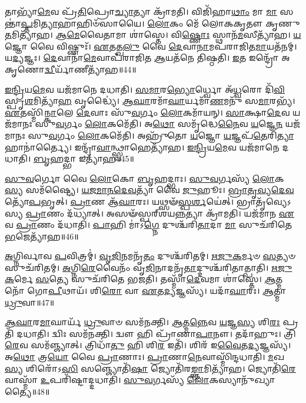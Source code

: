 𑌤𑌾𑌭𑍍𑌯𑌾᳴\-\ul{𑌮𑍇}\-𑌵 𑌪𑍍𑌰᳴\-\ul{𑌤𑌿}\-𑌪𑍍𑌰𑍋\-\ul{𑌚𑍍𑌯𑌾}\-𑌤𑍍𑌯𑌾 𑌕𑍍𑌰𑌾᳴𑌮𑌤𑌿।
𑌵𑌿𑌜𑌿᳴𑌹𑌾\-\ul{𑌥𑌾𑌂} 𑌮𑌾 \ul{𑌮𑌾} 𑌸𑌨𑍍𑌤𑌾॑\-\ul{𑌪𑍍𑌤}\-𑌮𑌿\-\ul{𑌤𑍍𑌯𑌾}\-𑌹𑌾𑌹𑌿𑍞᳴𑌸𑌾𑌯𑍈।
\-\ul{𑌲𑍋}\-𑌕𑌂 𑌮𑍇᳴ 𑌲𑍋𑌕𑌕𑍃𑌤𑍗 𑌕𑍃𑌣𑍁\-\ul{𑌤}\-𑌮𑌿𑌤𑍍𑌯𑌾᳴𑌹।
\-\ul{𑌆}\-\-\-\ul{𑌮𑍇}\-𑌵𑍈𑌤𑌾𑌮𑌾 𑌶𑌾॑𑌸𑍍𑌤𑍇।
𑌵𑌿\-\ul{𑌷𑍍𑌣𑍋𑌃} 𑌸𑍍𑌥𑌾𑌨᳴\-\ul{𑌮}\-𑌸𑍀𑌤𑍍𑌯𑌾᳴𑌹।
\-\ul{𑌯}\-𑌜𑍍𑌞𑍋 𑌵𑍈 𑌵𑌿𑌷𑍍𑌣𑍁𑌃᳴।
\-\ul{𑌏}\-𑌤𑌤𑍍𑌖\-\ul{𑌲𑍁} 𑌵𑍈 \ul{𑌦𑍇}\-𑌵𑌾\-\ul{𑌨𑌾}\-𑌮𑌪᳴𑌰𑌾𑌜𑌿𑌤\-\ul{𑌮𑌾}\-𑌯𑌤᳴𑌨𑌮𑍍।
𑌯\-\ul{𑌦𑍍𑌯}\-𑌜𑍍𑌞𑌃।
\-\ul{𑌦𑍇}\-𑌵𑌾𑌨𑌾᳴\-\ul{𑌮𑍇}\-𑌵𑌾𑌪᳴𑌰𑌾𑌜𑌿𑌤 \ul{𑌆}\-𑌯𑌤᳴𑌨𑍇 𑌤𑌿𑌷𑍍𑌠𑌤𑌿।
\-\ul{𑌇}\-𑌤 𑌇𑌨𑍍𑌦𑍍𑌰𑍋᳴ 𑌅𑌕𑍃𑌣𑍋\-\ul{𑌦𑍍𑌵𑍀}\-𑌰𑍍𑌯𑌾᳴\-𑌣𑍀𑌤𑍍𑌯𑌾᳴𑌹॥44॥

\-\ul{𑌇}\-\-\ul{𑌨𑍍𑌦𑍍𑌰𑌿}\-𑌯\-\ul{𑌮𑍇}\-𑌵 𑌯𑌜᳴𑌮𑌾𑌨𑍇 𑌦𑌧𑌾𑌤𑌿।
\-\ul{𑌸}\-\-\ul{𑌮𑌾}\-𑌰\-\ul{𑌭𑍍𑌯𑍋}\-𑌰𑍍𑌧𑍍𑌵𑍋 𑌅᳴\-\ul{𑌧𑍍𑌵}\-𑌰𑍋 𑌦𑌿᳴\-\ul{𑌵𑌿}\-𑌸𑍍𑌪𑍃\-\ul{𑌶}\-𑌮𑌿𑌤𑍍𑌯𑌾᳴\-\ul{𑌹} 𑌵𑍃𑌦𑍍𑌧𑍍𑌯𑍈॑।
\-\ul{𑌆}\-\-\ul{𑌘𑌾}\-𑌰𑌮𑌾᳴\-\ul{𑌘𑌾}\-𑌰𑍍𑌯𑌮𑌾᳴\-\ul{𑌣}\-𑌮𑌨𑍁᳴ 𑌸\-\ul{𑌮𑌾}\-𑌰𑌭𑍍𑌯᳴।
\-\ul{𑌏}\-𑌤𑌸𑍍𑌮𑌿᳴\-\ul{𑌨𑍍𑌕𑌾}\-𑌲𑍇 \ul{𑌦𑍇}\-𑌵𑌾𑌃 𑌸𑍁᳴\-\ul{𑌵}\-𑌰𑍍𑌗𑌂 \ul{𑌲𑍋}\-𑌕𑌮𑌾᳴𑌯𑌨𑍍।
\-\ul{𑌸𑌾}\-𑌕𑍍𑌷𑌾\-\ul{𑌦𑍇}\-𑌵 𑌯𑌜᳴𑌮𑌾𑌨𑌃 𑌸𑍁\-\ul{𑌵}\-𑌰𑍍𑌗𑌂 \ul{𑌲𑍋}\-𑌕𑌮𑍇᳴𑌤𑌿।
𑌅\-\ul{𑌥𑍋} 𑌸𑌮𑍃᳴𑌦𑍍𑌧𑍇\-\ul{𑌨𑍈}\-𑌵 \ul{𑌯}\-𑌜𑍍𑌞𑍇\-\ul{𑌨} 𑌯𑌜᳴𑌮𑌾𑌨𑌃 𑌸𑍁\-\ul{𑌵}\-𑌰𑍍𑌗𑌂 \ul{𑌲𑍋}\-𑌕𑌮𑍇᳴𑌤𑌿।
𑌅𑌹𑍍𑌰𑍁᳴𑌤𑍋 \ul{𑌯}\-𑌜𑍍𑌞𑍋 \ul{𑌯}\-𑌜𑍍𑌞𑌪᳴\-\ul{𑌤𑍇}\-𑌰𑌿\-\ul{𑌤𑍍𑌯𑌾}\-𑌹𑌾𑌨𑌾॑𑌰𑍍𑌤𑍍𑌯𑍈।
𑌇𑌨𑍍𑌦𑍍𑌰𑌾᳴\-\ul{𑌵𑌾}\-𑌨𑍍𑌥𑍍𑌸𑍍𑌵𑌾𑌹𑍇𑌤𑍍𑌯𑌾᳴𑌹।
\-\ul{𑌇}\-\-\ul{𑌨𑍍𑌦𑍍𑌰𑌿}\-𑌯\-\ul{𑌮𑍇}\-𑌵 𑌯𑌜᳴𑌮𑌾𑌨𑍇 𑌦𑌧𑌾𑌤𑌿।
\-\ul{𑌬𑍃}\-𑌹𑌦𑍍𑌭𑌾 𑌇𑌤𑍍𑌯𑌾᳴𑌹॥45॥

\-\ul{𑌸𑍁}\-\-\ul{𑌵}\-𑌰𑍍𑌗𑍋 𑌵𑍈 \ul{𑌲𑍋}\-𑌕𑍋 \ul{𑌬𑍃}\-𑌹𑌦𑍍𑌭𑌾𑌃।
\-\ul{𑌸𑍁}\-\-\ul{𑌵}\-𑌰𑍍𑌗𑌸𑍍𑌯᳴ \ul{𑌲𑍋}\-𑌕\-\ul{𑌸𑍍𑌯} 𑌸𑌮᳴𑌷𑍍𑌟𑍍𑌯𑍈।
\-\ul{𑌯}\-\-\ul{𑌜}\-\-\ul{𑌮𑌾}\-\-\ul{𑌨}\-\-\ul{𑌦𑍇}\-\-\ul{𑌵}\-𑌤𑍍𑌯𑌾᳴ 𑌵𑍈 \ul{𑌜𑍁}\-𑌹𑍂𑌃।
\-\ul{𑌭𑍍𑌰𑌾}\-\-\ul{𑌤𑍃}\-\-\ul{𑌵𑍍𑌯}\-\-\ul{𑌦𑍇}\-\-\ul{𑌵}\-𑌤𑍍𑌯𑍋᳴\-\ul{𑌪}\-𑌭𑍃𑌤𑍍।
\-\ul{𑌪𑍍𑌰𑌾}\-𑌣 𑌆᳴\-\ul{𑌘𑌾}\-𑌰𑌃।
𑌯𑌥𑍍𑌸𑍟᳴\-\ul{𑌸𑍍𑌪}\-\-\ul{𑌰𑍍}\-𑌶𑌯𑍇॑𑌤𑍍।
𑌭𑍍𑌰𑌾𑌤𑍃᳴𑌵𑍍𑌯𑍇𑌽𑌸𑍍𑌯 \ul{𑌪𑍍𑌰𑌾}\-𑌣𑌂 𑌦᳴𑌧𑍍𑌯𑌾𑌤𑍍।
𑌅𑌸𑍟᳴𑌸𑍍𑌪𑌰𑍍‌\mbox{}𑌶𑌯\-\ul{𑌨𑍍𑌨}\-𑌤𑍍𑌯𑌾 𑌕𑍍𑌰𑌾᳴𑌮𑌤𑌿।
𑌯𑌜᳴𑌮𑌾𑌨 \ul{𑌏}\-𑌵 \ul{𑌪𑍍𑌰𑌾}\-𑌣𑌂 𑌦᳴𑌧𑌾𑌤𑌿।
\-\ul{𑌪𑌾}\-𑌹𑌿 𑌮𑌾॑\-𑌽\-\ul{𑌗𑍍𑌨𑍇} 𑌦𑍁𑌶𑍍𑌚᳴𑌰𑌿\-\ul{𑌤𑌾}\-𑌦𑌾 \ul{𑌮𑌾} 𑌸𑍁𑌚᳴𑌰𑌿𑌤𑍇 \ul{𑌭}\-𑌜𑍇𑌤𑍍𑌯𑌾᳴𑌹॥46॥

\-\ul{𑌅}\-𑌗𑍍𑌨𑌿𑌰𑍍𑌵𑌾𑌵 \ul{𑌪}\-𑌵𑌿𑌤𑍍𑌰𑌮𑍍॑।
\-\ul{𑌵𑍃}\-\-\ul{𑌜𑌿}\-𑌨𑌮𑌨𑍃᳴\-\ul{𑌤𑌂} 𑌦𑍁𑌶𑍍𑌚᳴𑌰𑌿𑌤𑌮𑍍।
\-\ul{𑌋}\-\-\ul{𑌜𑍁}\-\-\ul{𑌕}\-𑌰𑍍𑌮𑍞 \ul{𑌸}\-𑌤𑍍𑌯𑍞 𑌸𑍁𑌚᳴𑌰𑌿𑌤𑌮𑍍।
\-\ul{𑌅}\-𑌗𑍍𑌨𑌿\-\ul{𑌰𑍇}\-𑌵𑍈𑌨𑌂᳴ 𑌵𑍃\-\ul{𑌜𑌿}\-𑌨𑌾𑌦𑌨𑍃᳴\-\ul{𑌤𑌾}\-𑌦𑍍𑌦𑍁𑌶𑍍𑌚᳴𑌰𑌿𑌤𑌾𑌤𑍍𑌪𑌾𑌤𑌿।
\-\ul{𑌋}\-\-\ul{𑌜𑍁}\-\-\ul{𑌕}\-𑌰𑍍𑌮𑍇 \ul{𑌸}\-𑌤𑍍𑌯𑍇 𑌸𑍁𑌚᳴𑌰𑌿𑌤𑍇 𑌭𑌜𑌤𑌿।
𑌤𑌸𑍍𑌮𑌾᳴\-\ul{𑌦𑍇}\-𑌵𑌮𑌾 𑌶𑌾॑𑌸𑍍𑌤𑍇।
\-\ul{𑌆}\-𑌤𑍍𑌮𑌨𑍋᳴ 𑌗𑍋\-\ul{𑌪𑍀}\-𑌥𑌾𑌯᳴।
𑌶𑌿\-\ul{𑌰𑍋} 𑌵𑌾 \ul{𑌏}\-𑌤\-\ul{𑌦𑍍𑌯}\-𑌜𑍍𑌞𑌸𑍍𑌯᳴।
𑌯𑌦𑌾᳴\-\ul{𑌘𑌾}\-𑌰𑌃।
\-\ul{𑌆}\-𑌤𑍍𑌮𑌾 \ul{𑌧𑍍𑌰𑍁}\-𑌵𑌾॥47॥

\-\ul{𑌆}\-\-\ul{𑌘𑌾}\-𑌰\-\ul{𑌮𑌾}\-𑌘𑌾𑌰𑍍𑌯᳴ \ul{𑌧𑍍𑌰𑍁}\-𑌵𑌾𑍞 𑌸𑌮᳴𑌨𑌕𑍍𑌤𑌿।
\-\ul{𑌆}\-𑌤𑍍𑌮\-\ul{𑌨𑍍𑌨𑍇}\-𑌵 \ul{𑌯}\-𑌜𑍍𑌞\-\ul{𑌸𑍍𑌯} 𑌶𑌿\-\ul{𑌰𑌃} 𑌪𑍍𑌰𑌤𑌿᳴ 𑌦𑌧𑌾𑌤𑌿।
𑌦𑍍𑌵𑌿𑌃 𑌸𑌮᳴𑌨𑌕𑍍𑌤𑌿।
𑌦𑍍𑌵𑍗 𑌹𑌿 𑌪𑍍𑌰𑌾᳴𑌣𑌾\-\ul{𑌪𑌾}\-𑌨𑍗।
𑌤𑌦𑌾᳴𑌹𑍁𑌃।
𑌤𑍍𑌰𑌿\-\ul{𑌰𑍇}\-𑌵 𑌸𑌮᳴𑌞𑍍𑌜𑍍𑌯𑌾𑌤𑍍।
𑌤𑍍𑌰𑌿𑌧𑌾᳴\-\ul{𑌤𑍁} 𑌹𑌿 𑌶𑌿\-\ul{𑌰} 𑌇𑌤𑌿᳴।
𑌶𑌿𑌰᳴ 𑌇\-\ul{𑌵𑍈}\-𑌤\-\ul{𑌦𑍍𑌯}\-𑌜𑍍𑌞𑌸𑍍𑌯᳴।
𑌅\-\ul{𑌥𑍋} 𑌤𑍍𑌰\-\ul{𑌯𑍋} 𑌵𑍈 \ul{𑌪𑍍𑌰𑌾}\-𑌣𑌾𑌃।
\-\ul{𑌪𑍍𑌰𑌾}\-𑌣𑌾\-\ul{𑌨𑍇}\-𑌵𑌾𑌸𑍍𑌮𑌿᳴𑌨𑍍𑌦𑌧𑌾𑌤𑌿।
\-\ul{𑌮}\-𑌖\-\ul{𑌸𑍍𑌯} 𑌶𑌿𑌰𑍋᳴𑌽\-\ul{𑌸𑌿} 𑌸𑌞𑍍𑌜𑍍𑌯𑍋𑌤𑌿᳴\-\ul{𑌷𑌾} 𑌜𑍍𑌯𑍋𑌤𑌿᳴𑌰\-\ul{𑌙𑍍𑌕𑍍𑌤𑌾}\-𑌮𑌿𑌤𑍍𑌯𑌾᳴𑌹।
𑌜𑍍𑌯𑍋𑌤𑌿᳴\-\ul{𑌰𑍇}\-𑌵𑌾𑌸𑍍𑌮𑌾᳴ \ul{𑌉}\-𑌪𑌰𑌿᳴𑌷𑍍𑌟𑌾𑌦𑍍𑌦𑌧𑌾𑌤𑌿।
\-\ul{𑌸𑍁}\-\-\ul{𑌵}\-𑌰𑍍𑌗𑌸𑍍𑌯᳴ \ul{𑌲𑍋}\-𑌕𑌸𑍍𑌯𑌾𑌨𑍁᳴𑌖𑍍𑌯𑌾𑌤𑍍𑌯𑍈॥48॥\anuvakamend[𑌪𑌰𑌿᳴𑌦𑌧𑌾𑌤𑌿 \ul{𑌪𑍍𑌰𑌾}\-𑌣𑌂 𑌦᳴𑌧𑌾\-\ul{𑌤𑌿} 𑌹𑌿 \ul{𑌯}\-𑌜𑍍𑌞𑍋 𑌘𑌾᳴𑌰𑌯\-\ul{𑌤𑌿} 𑌨\-\ul{𑌮} 𑌇𑌤𑍍𑌯𑌾᳴𑌹 \ul{𑌪}\-𑌶𑍍𑌚𑌾\-\ul{𑌦𑍍𑌵𑍀}\-𑌰𑍍𑌯𑌾᳴𑌣𑍀𑌤𑍍𑌯𑌾᳴\-\ul{𑌹} 𑌭𑌾 𑌇𑌤𑍍𑌯𑌾᳴𑌹 \ul{𑌭}\-𑌜𑍇𑌤𑍍𑌯𑌾᳴𑌹 \ul{𑌧𑍍𑌰𑍁}\-𑌵𑍈𑌵𑌾𑌸𑍍𑌮𑌿᳴𑌨𑍍𑌦𑌧𑌾\-\ul{𑌤𑌿} 𑌤𑍍𑌰𑍀𑌣𑌿᳴ 𑌚]

